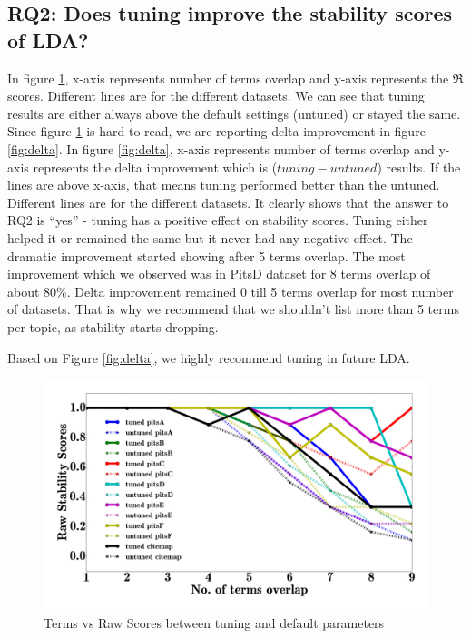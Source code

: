\documentclass[conference]{IEEEtran}
\theoremstyle{break}
\begin{document}
\subsection{\textbf{RQ2: Does tuning improve the stability scores of LDA?}}

In figure \ref{fig:raw}, x-axis represents number of terms overlap and y-axis represents the $\Re$ scores. Different lines are for the different datasets. We can see that tuning results are either always above the default settings (untuned) or stayed the same. Since figure \ref{fig:raw} is hard to read, we are reporting delta improvement in figure \ref{fig:delta}. In figure \ref{fig:delta}, x-axis represents number of terms overlap and y-axis represents the delta improvement which is ($tuning - untuned$) results. If the lines are above x-axis, that means tuning performed better than the untuned. Different lines are for the different datasets. It clearly shows that the answer to RQ2 is “yes” - tuning has a positive effect on stability scores. Tuning either helped it or remained the same but it never had any negative effect. The dramatic improvement started showing after 5 terms overlap. The most improvement which we observed was in PitsD dataset for 8 terms overlap of about 80\%. Delta improvement remained 0 till 5 terms overlap for most number of datasets. That is why we recommend that we shouldn't list more than 5 terms per topic, as stability starts dropping.

\begin{lesson}
Based on Figure \ref{fig:delta}, we highly recommend tuning in future LDA.
\end{lesson}

\begin{center}
\begin{figure}[!htbp]
  \includegraphics[width=\linewidth]{./fig/raw_graph.png}
  \caption{Terms vs Raw Scores between tuning and default parameters}
  \label{fig:raw}
\end{figure}
\vspace{-2cm}
\end{center}
\end{document}
